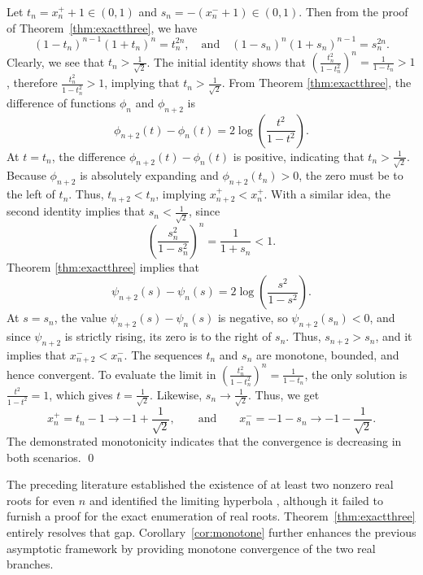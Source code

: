 \documentclass[12pt]{article}
\theoremstyle{definition}
\renewenvironment{proof}{{\noindent\bfseries Proof.}}{\qed}
\begin{document}
	\begin{proof}
		Let $t_n=x_n^++1\in(0,1)$ and $s_n=-(x_n^-+1)\in(0,1)$. Then from the proof of Theorem~\ref{thm:exactthree}, we have
		$$
		(1-t_n)^{n-1}(1+t_n)^n=t_n^{2n},\quad \text{and} \quad 	(1-s_n)^n(1+s_n)^{n-1}=s_n^{2n}.
		$$
		 Clearly, we see that $t_n>\tfrac{1}{\sqrt{2}}$. The initial identity shows that \(\left(\frac{t_n^2}{1-t_n^2}\right)^n=\frac{1}{1-t_n}>1 \), therefore \(\frac{t_n^2}{1-t_n^2}>1 \), implying that \(t_n>\frac{1}{\sqrt{2}} \).  From Theorem \ref{thm:exactthree}, the difference of functions $\phi_n$ and $\phi_{n+2}$ is
		 \begin{equation*}
		 	\phi_{n+2}(t)-\phi_n(t)=2\log\left(\frac{t^2}{1-t^2}\right).
		 \end{equation*}
		 At \(t=t_n \), the difference \(\phi_{n+2}(t)-\phi_n(t) \) is positive, indicating that \(t_n > \frac{1}{\sqrt{2}} \). Because $\phi_{n+2}$ is absolutely expanding and $\phi_{n+2}(t_n) > 0$, the zero must be to the left of $t_n$. Thus, $t_{n+2} < t_n$, implying $x_{n+2}^+ < x_n^+$.
		With a similar idea, the second identity implies that $s_n<\tfrac{1}{\sqrt2}$, since
		$$
		\left(\frac{s_n^2}{1-s_n^2}\right)^n=\frac{1}{1+s_n}<1.
		$$
		Theorem \ref{thm:exactthree} implies that
		$$
		\psi_{n+2}(s)-\psi_n(s)=2\log\left(\frac{s^2}{1-s^2}\right).
		$$
		At $s=s_n$, the value $\psi_{n+2}(s)-\psi_n(s)$ is negative,  so $\psi_{n+2}(s_n)<0$, and since $\psi_{n+2}$ is strictly rising, its zero is to the right of $s_n$. Thus, $s_{n+2}>s_n$, and it implies that $x_{n+2}^-<x_n^-$. The sequences ${t_n}$ and ${s_n}$ are monotone, bounded, and hence convergent. To evaluate the limit in $\left(\frac{t_n^2}{1-t_n^2}\right)^n=\frac{1}{1-t_n}$, the only solution is $\tfrac{t^2}{1-t^2}=1$, which gives $t=\tfrac{1}{\sqrt2}$.
		 Likewise, $s_n\to \tfrac{1}{\sqrt2}$. Thus, we get
		$$
		x_n^+=t_n-1 \to -1+\frac{1}{\sqrt2},
		\qquad\text{and} \qquad
		x_n^-=-1-s_n \to -1-\frac{1}{\sqrt2}.
		$$
		The demonstrated monotonicity indicates that the convergence is decreasing in both scenarios.
	\end{proof}
	
	 The preceding literature established the existence of at least two nonzero real roots for even \( n \) and identified the limiting hyperbola \cite{AlikhaniBrownJahari2016}, although it failed to furnish a proof for the exact enumeration of real roots. Theorem~\ref{thm:exactthree} entirely resolves that gap. Corollary~\ref{cor:monotone} further enhances the previous asymptotic framework by providing monotone convergence of the two real branches.
	
\end{document}
